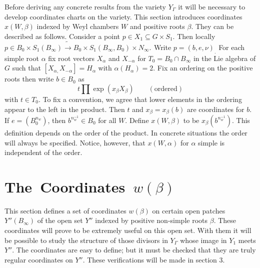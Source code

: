 \documentclass{memo-l}
\theoremstyle{definition}
\theoremstyle{remark}
\numberwithin{section}{chapter}
\numberwithin{equation}{chapter}
\begin{document}
Before deriving any concrete results from the variety $Y_{{\Gamma}}$ it will 
be necessary to develop coordinates charts on the variety. 
 This section introduces coordinates $x(W,{\beta})$ indexed by Weyl chambers 
$W$ and positive roots ${\beta}$. 
 They can be described as follows. 
 Consider a point $p \in X_{1} {\subseteq} G \times S_{1}$. 
 Then locally $p \in B_{0} \times S_{1}(B_{{\infty}}) \tilde{\to}  B_{0} 
\times S_{1}(B_{{\infty}},B_{0}) \times N_{{\infty}}._{ }$ Write 
$p = (b,e,{\nu})_{.}$  For each simple root ${\alpha}$ fix root vectors 
$X_{{\alpha}}$ and $X_{-{\alpha}}$ for $T_{0} = B_{0} {\cap} B_{{\infty}}$ 
in the Lie algebra of $G$ such that $[X_{{\alpha},}X_{-{\alpha}}] = 
H_{{\alpha}}$ with ${\alpha}(H_{{\alpha}})=2$. 
 Fix an ordering on the positive roots then write $b \in B_{0}$  as
$$
t \prod  \exp(x_{{\beta}}X_{{\beta}})\qquad  ({\text{ordered}})
$$
with $t \in T_{0}$. 
 To fix a convention, we agree that lower elements in the ordering appear 
to the left in the product. 
 Then $t$ and $x_{{\beta}} = x_{{\beta}}(b)$ are coordinates for $b$. 
  If $e = (B_{0}^{n_w})$, then $b^{n_w^{-1}} \in B_{0}$ for all $W$. 
 Define $x(W,{\beta})$ to be $x_{{\beta}}(b^{n_w^{-1}})$. 
 This definition depends on the order of the product. 
 In concrete situations the order will always be specified. 
 Notice, however, that $x(W,{\alpha})$ for ${\alpha}$ simple is independent 
of the order.

\section{The\ Coordinates\ $w({\beta})$ }

This section defines a set of coordinates $w({\beta})$ on certain open 
patches $Y''(B_{{\infty}})$ of the open set $Y''$ indexed by positive non-simple 
roots ${\beta}$. 
 These coordinates will prove to be extremely useful on this open set. 
 With them it will be possible to study the structure of those divisors in 
$Y_{{\Gamma}}$ whose image in $Y_{1}$ meets $Y''$. 
 The coordinates are easy to define; but it must be checked that they are 
truly regular coordinates on $Y''$. 
 These verifications will be made in section $3$.
\end{document}
